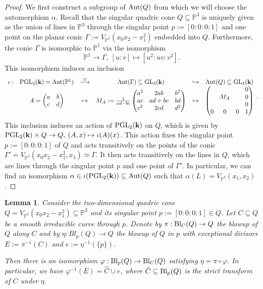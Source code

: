 \documentclass[english,11pt,reqno]{amsart}
\newcommand{\sub}{\subseteq}
\newcommand{\Pone}{\mathbb{P}^1}
\newcommand{\Ptwo}{\mathbb{P}^2}
\newcommand{\Pthree}{\mathbb{P}^3}
\newcommand{\VPtwo}{V_{\Ptwo}}
\newcommand{\VPthree}{V_{\Pthree}}
\newcommand{\kk}{\mathbf{k}}
\newcommand{\Bl}{\textup{Bl}}
\newcommand{\PGL}{\textup{PGL}}
\newcommand{\GL}{\textup{GL}}
\newcommand{\Aut}{\textup{Aut}}
\newtheorem{lem}[thm]{Lemma}
\begin{document}
\begin{proof}
We first construct a subgroup of $\Aut(Q)$ from which we will choose the automorphism $\alpha$. Recall that the singular quadric cone $Q\sub\Pthree$ is uniquely given as the union of lines in $\Pthree$ through the singular point $p:=[0:0:0:1]$ and one point on the planar conic $\Gamma:=\VPtwo(x_0x_2-x_1^2)$ embedded into $Q$. Furthermore, the conic $\Gamma$ is isomorphic to $\Pone$ via the isomorphism 
$$ \Pone \rightarrow \Gamma, \: [u:v]\mapsto [u^2:uv:v^2].$$
This isomorphism induces an inclusion
$$\begin{array}{c c c c c c}
\iota: &\PGL_2(\kk) = \Aut(\Pone) &\overset{\simeq}{\longrightarrow} &\Aut(\Gamma)\sub\GL_3(\kk) &\hookrightarrow &\Aut(Q)\sub \GL_4(\kk)\\
&A=\begin{pmatrix}
a & b\\
c & d
\end{pmatrix}
& \mapsto 
&M_A:=\frac{1}{ad-bc} \begin{pmatrix}
a^2 & 2ab & b^2\\
ac & ad+bc & bd\\
c^2 & 2cd & d^2
\end{pmatrix}
&\mapsto 
&\begin{pmatrix}
& & &0\\
& M_A& &0\\
& & &0\\
0&0&0&1
\end{pmatrix}
\end{array}. $$
This inclusion induces an action of $\PGL_2(\kk)$ on $Q$, which is given by $\PGL_2(\kk)\times Q \rightarrow Q, \: (A,x)\mapsto \iota(A)(x)$. This action fixes the singular point 
$p:=[0:0:0:1]$ of $Q$
and acts transitively on the points of the conic $\Gamma'=\VPthree(x_0x_2-x_1^2,x_3)\simeq \Gamma$. It then acts transitively on the lines in $Q$, which are lines through the singular point $p$ and one point of $\Gamma'$. In particular, we can find an isomorphism $\alpha \in \iota(\PGL_2(\kk))\sub \Aut(Q)$ such that $\alpha(L)=\VPthree(x_1,x_2)$.
\end{proof}
%
%
\begin{lem} \label{lem:blowup_quadric_cone_along_curve}
Consider the two-dimensional quadric cone $Q=\VPthree(x_0x_2-x_1^2)\sub \Pthree$ and its singular point $p:=[0:0:0:1]\in Q$. Let $C\sub Q$ be a smooth irreducible curve through $p$. Denote by $\pi: \Bl_C(Q)\rightarrow Q$ the blowup of $Q$ along $C$ and by $\eta:Bl_p(Q)\rightarrow Q$ the blowup of $Q$ in $p$ with exceptional divisors $E:=\pi^{-1}(C)$ and $e:=\eta^{-1}(\{p\})$. \par 
Then there is an isomorphism $\varphi:\Bl_p(Q)\rightarrow \Bl_C(Q)$ satisfying $\eta = \pi \circ \varphi$. In particular, we have $\varphi^{-1}(E) = \hat{C} \cup e$, where $\hat{C} \sub \Bl_p(Q)$ is the strict transform of $C$ under $\eta$.
\end{lem}
\end{document}
